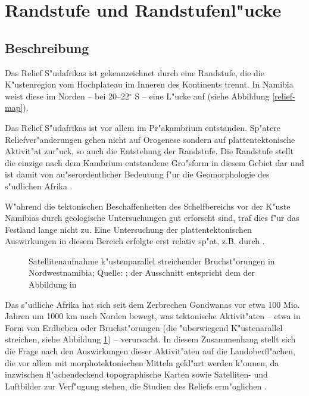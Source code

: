 \documentclass[titlepage,a4paper]{scrartcl}
\begin{document}
\section{Randstufe und Randstufenl"ucke} \label{luecke}

\subsection{Beschreibung}

Das Relief S"udafrikas ist gekennzeichnet durch eine Randstufe, die die K"ustenregion vom Hochplateau im Inneren des Kontinents trennt. In Namibia weist diese im Norden -- bei 20--22$^\circ$ S -- eine L"ucke auf (siehe Abbildung \ref{relief-map}).

Das Relief S"udafrikas ist vor allem im Pr"akambrium entstanden. Sp"atere Reliefver"anderungen gehen nicht auf Orogenese sondern auf plattentektonische Aktivit"at zur"uck, so auch die Entstehung der  Randstufe. Die Randstufe stellt die einzige nach dem Kambrium entstandene Gro"sform in diesem Gebiet dar und ist damit von au"serordentlicher Bedeutung f"ur die Geomorphologie des s"udlichen Afrika \citep{Hueser1989}.

W"ahrend die tektonischen Beschaffenheiten des Schelfbereichs vor der K"uste Namibias durch geologische Untersuchungen gut erforscht sind, traf dies f"ur das Festland lange nicht zu. Eine Untersuchung der plattentektonischen Auswirkungen in diesem Bereich erfolgte erst relativ sp"at, z.B. durch \cite{BrunotteAndSpoenemann1997}.

\begin{figure}
\begin{center}
\end{center}
\caption[Satellitenaufnahme: Bruchst"orungen in Nordwestnamibia]{Satellitenaufnahme k"ustenparallel streichender Bruchst"orungen in Nordwestnamibia; Quelle: ; der Ausschnitt entspricht dem der Abbildung in \cite{BrunotteAndSpoenemann1997}}
\label{sat}
\end{figure}

Das s"udliche Afrika hat sich seit dem Zerbrechen Gondwanas vor etwa 100 Mio. Jahren um 1000 km nach Norden bewegt, was tektonische Aktivit"aten -- etwa in Form von Erdbeben oder Bruchst"orungen (die "uberwiegend K"ustenarallel streichen, siehe Abbildung \ref{sat}) -- verursacht. In diesem Zusammenhang stellt sich die Frage nach den Auswirkungen dieser Aktivit"aten auf die Landoberfl"achen, die vor allem mit morphotektonischen Mitteln gekl"art werden k"onnen, da inzwischen fl"achendeckend topographische Karten sowie Satelliten- und Luftbilder zur Verf"ugung stehen, die Studien des Reliefs erm"oglichen \citep{BrunotteAndSpoenemann1997}.
\end{document}
